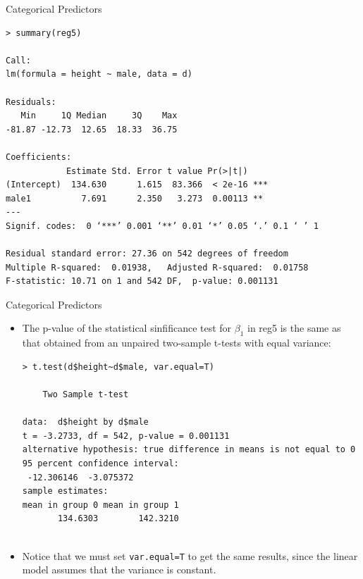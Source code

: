 \documentclass[handout]{beamer}
\begin{document}
\begin{frame}[fragile]{Categorical Predictors}
\scriptsize{ 

\begin{verbatim}
> summary(reg5)

Call:
lm(formula = height ~ male, data = d)

Residuals:
   Min     1Q Median     3Q    Max 
-81.87 -12.73  12.65  18.33  36.75 

Coefficients:
            Estimate Std. Error t value Pr(>|t|)    
(Intercept)  134.630      1.615  83.366  < 2e-16 ***
male1          7.691      2.350   3.273  0.00113 ** 
---
Signif. codes:  0 ‘***’ 0.001 ‘**’ 0.01 ‘*’ 0.05 ‘.’ 0.1 ‘ ’ 1

Residual standard error: 27.36 on 542 degrees of freedom
Multiple R-squared:  0.01938,	Adjusted R-squared:  0.01758 
F-statistic: 10.71 on 1 and 542 DF,  p-value: 0.001131
\end{verbatim}



}
\end{frame}


\begin{frame}[fragile]{Categorical Predictors}
\scriptsize{ 
\begin{itemize}
\item The p-value of the statistical sinfificance test for $\beta_1$ in reg5  is the same as that obtained from an unpaired two-sample t-tests with equal variance:
\begin{verbatim}
> t.test(d$height~d$male, var.equal=T)

	Two Sample t-test

data:  d$height by d$male
t = -3.2733, df = 542, p-value = 0.001131
alternative hypothesis: true difference in means is not equal to 0
95 percent confidence interval:
 -12.306146  -3.075372
sample estimates:
mean in group 0 mean in group 1 
       134.6303        142.3210 
 
\end{verbatim}

\item Notice that we must set \verb+var.equal=T+ to get the same results, since the linear model assumes that the variance is constant.


\end{itemize}





}
\end{frame}
\end{document}
